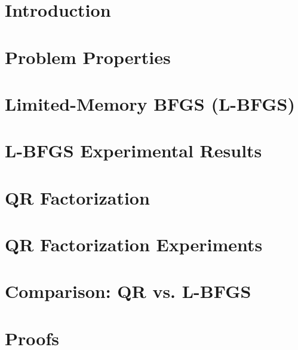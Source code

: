 \documentclass[a4paper, 11pt, oneside]{book}
\begin{document}
\tableofcontents
\clearpage

\sloppy
{}

\chapter{Introduction}

\clearpage

\chapter{Problem Properties}

\clearpage

\chapter{Limited-Memory BFGS (L-BFGS)}

\clearpage

\chapter{L-BFGS Experimental Results}

\clearpage

\chapter{QR Factorization}

\clearpage

\chapter{QR Factorization Experiments}

\clearpage

\chapter{Comparison: QR vs. L-BFGS}

\clearpage

\appendix
\chapter{Proofs}

\clearpage

\printbibliography[heading=bibintoc]
\end{document}
